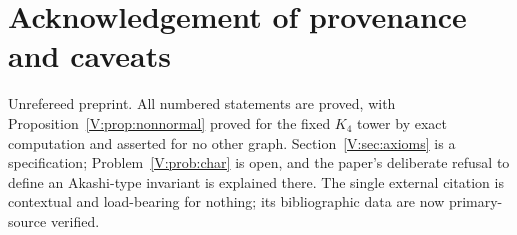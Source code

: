 \section*{Acknowledgement of provenance and caveats}

Unrefereed preprint. All numbered statements are proved, with
Proposition~\ref{V:prop:nonnormal} proved for the fixed $K_4$ tower by exact
computation and asserted for no other graph. Section~\ref{V:sec:axioms} is a
specification; Problem~\ref{V:prob:char} is open, and the paper's deliberate refusal to
define an Akashi-type invariant is explained there. The single external citation
\cite{CFKSV} is contextual and load-bearing for nothing; its bibliographic data are
now primary-source verified.

